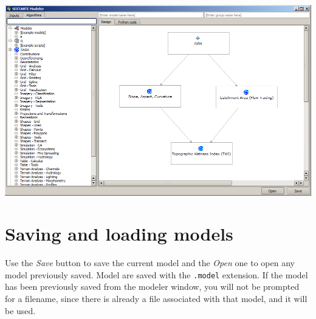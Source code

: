 \begin{center}
\includegraphics[width=.8\columnwidth]{models_parameters5.png}
\end{center}


%
%
%
%


\section{Saving and loading models}


Use the \emph{Save} button to save the current model and the \emph{Open} one to open any model previously saved. Model are saved with the \texttt{.model} extension. If the model has been previously saved from the modeler window, you will not be prompted for a filename, since there is already a file associated with that model, and it will be used.


